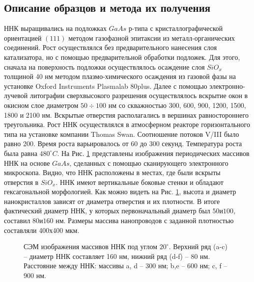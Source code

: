 \documentclass[a4paper,14pt,russian]{extreport}
\begin{document}
			\subsection{Описание образцов и метода их получения}
				ННК выращивались на подложках $GaAs$ р-типа с кристаллографической ориентацией $(111)$ методом газофазной эпитаксии из металл-органических соединений. Рост осуществлялся без предварительного нанесения слоя катализатора, но с помощью предварительной обработки подложек. Для этого, сначала на поверхность подложки осуществлялось осаждение слоя $SiO_x$ толщиной 40 нм методом плазмо-химического осаждения из газовой фазы на установке Oxford Instruments Plasmalab 80plus. Далее с помощью электронно-лучевой литографии сверхвысокого разрешения осуществлялось вскрытие окон в окисном слое диаметром $50 \div 100$ нм со скважностью 300, 600, 900, 1200, 1500, 1800 и 2100 нм. Вскрытые отверстия располагались в вершинах равностороннего треугольника. Рост ННК осуществлялся в атмосферном реакторе горизонтального типа на установке компании Thomas Swan. Соотношение потоков V/III было равно 200. Время роста варьировалось от 60 до 300 секунд. Температура роста была равна $480^\circ C$. На Рис. \ref{ris:OrderedSamples} представлены изображения периодических массивов ННК на основе $GaAs$, сделанных с помощью сканирующего электронного микроскопа. Видно, что ННК расположены в местах, где были вскрыты отверстия в $SiO_x$. ННК имеют вертикальные боковые стенки и обладают гексагональной морфологией. Как можно видеть на Рис. \ref{ris:OrderedSamples}, высота и диаметр нанокристаллов зависят от диаметра отверстия и их плотности. В итоге фактический диаметр ННК, у которых первоначальный диаметр был $50 \text{и} 100$, составил $80 \text{и} 160$ нм. Размеры массива нанопроводов с заданной плотностью составляли 400х400 мкм.
				\begin{figure}[H]
					\caption{СЭМ изображения массивов ННК под углом $20^\circ$. Верхний ряд (a-c) – диаметр ННК составляет 160 нм, нижний ряд (d-f) – 80 нм. Расстояние между ННК: массивы a, d – 300 нм; b,e – 600 нм; c, f – 900 нм.}
				\label{ris:OrderedSamples}
				\end{figure}
\end{document}
